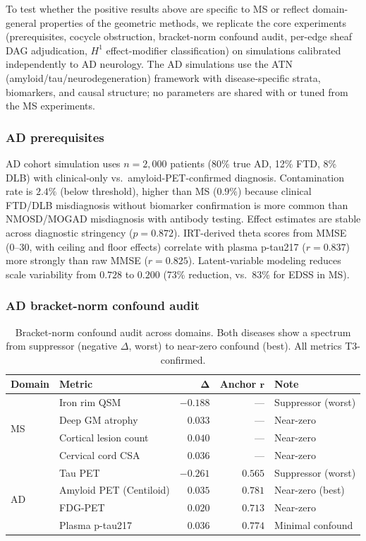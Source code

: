 \documentclass{article}
\begin{document}
To test whether the positive results above are specific to MS or reflect domain-general properties of the geometric methods, we replicate the core experiments (prerequisites, cocycle obstruction, bracket-norm confound audit, per-edge sheaf DAG adjudication, $H^1$ effect-modifier classification) on simulations calibrated independently to AD neurology.
The AD simulations use the ATN (amyloid/tau/neurodegeneration) framework \citep{jack2018niaaa} with disease-specific strata, biomarkers, and causal structure; no parameters are shared with or tuned from the MS experiments.

\subsubsection{AD prerequisites}

AD cohort simulation uses $n = 2{,}000$ patients (80\% true AD, 12\% FTD, 8\% DLB) with clinical-only vs.\ amyloid-PET-confirmed diagnosis.
Contamination rate is $2.4\%$ (below threshold), higher than MS ($0.9\%$) because clinical FTD/DLB misdiagnosis without biomarker confirmation is more common than NMOSD/MOGAD misdiagnosis with antibody testing.
Effect estimates are stable across diagnostic stringency ($p = 0.872$).
IRT-derived theta scores from MMSE (0--30, with ceiling and floor effects) correlate with plasma p-tau217 ($r = 0.837$) more strongly than raw MMSE ($r = 0.825$).
Latent-variable modeling reduces scale variability from $0.728$ to $0.200$ (73\% reduction, vs.\ 83\% for EDSS in MS).

\subsubsection{AD bracket-norm confound audit}

\begin{table}[t]
\centering
\caption{Bracket-norm confound audit across domains. Both diseases show a spectrum from suppressor (negative $\Delta$, worst) to near-zero confound (best). All metrics T3-confirmed.}
\label{tab:p1-cross}
\small
\begin{tabular}{@{}llrrl@{}}
\toprule
\textbf{Domain} & \textbf{Metric} & $\boldsymbol{\Delta}$ & \textbf{Anchor} $\boldsymbol{r}$ & \textbf{Note} \\
\midrule
\multirow{4}{*}{MS}
& Iron rim QSM & $-0.188$ & --- & Suppressor (worst) \\
& Deep GM atrophy & $0.033$ & --- & Near-zero \\
& Cortical lesion count & $0.040$ & --- & Near-zero \\
& Cervical cord CSA & $0.036$ & --- & Near-zero \\
\midrule
\multirow{4}{*}{AD}
& Tau PET & $-0.261$ & $0.565$ & Suppressor (worst) \\
& Amyloid PET (Centiloid) & $0.035$ & $0.781$ & Near-zero (best) \\
& FDG-PET & $0.020$ & $0.713$ & Near-zero \\
& Plasma p-tau217 & $0.036$ & $0.774$ & Minimal confound \\
\bottomrule
\end{tabular}
\end{table}
\end{document}

